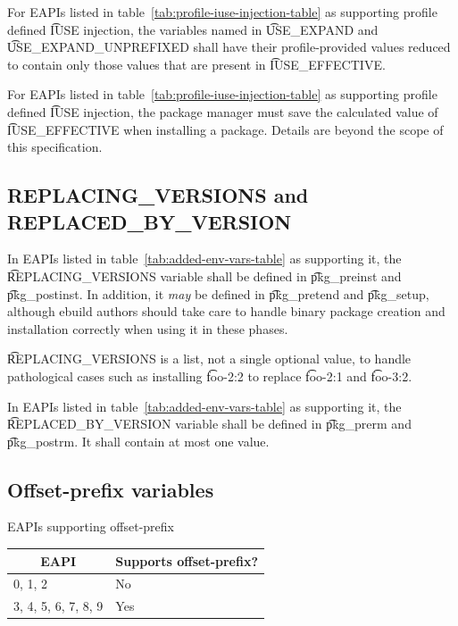 For EAPIs listed in table~\ref{tab:profile-iuse-injection-table} as supporting profile defined
\t{IUSE} injection, the variables named in \t{USE_EXPAND} and \t{USE_EXPAND_UNPREFIXED} shall
have their profile-provided values reduced to contain only those values that are present in
\t{IUSE_EFFECTIVE}.

For EAPIs listed in table~\ref{tab:profile-iuse-injection-table} as supporting profile defined
\t{IUSE} injection, the package manager must save the calculated value of \t{IUSE_EFFECTIVE} when
installing a package. Details are beyond the scope of this specification.

\subsection{REPLACING_VERSIONS and REPLACED_BY_VERSION}
\label{sec:replacing-versions}

 In EAPIs listed in table~\ref{tab:added-env-vars-table} as
supporting it, the \t{REPLACING_VERSIONS} variable shall be defined in \t{pkg_preinst} and
\t{pkg_postinst}. In addition, it \emph{may} be defined in \t{pkg_pretend} and \t{pkg_setup},
although ebuild authors should take care to handle binary package creation and installation
correctly when using it in these phases.

\t{REPLACING_VERSIONS} is a list, not a single optional value, to handle pathological cases such as
installing \t{foo-2:2} to replace \t{foo-2:1} and \t{foo-3:2}.

In EAPIs listed in table~\ref{tab:added-env-vars-table} as supporting it, the
\t{REPLACED_BY_VERSION} variable shall be defined in \t{pkg_prerm} and \t{pkg_postrm}. It shall
contain at most one value.

\subsection{Offset-prefix variables}
\label{sec:offset-vars}

\begin{centertable}{EAPIs supporting offset-prefix}
    \label{tab:offset-support-table}
    \begin{tabular}{ll}
      \toprule
      \multicolumn{1}{c}{\textbf{EAPI}} &
      \multicolumn{1}{c}{\textbf{Supports offset-prefix?}}\\
      \midrule
      0, 1, 2             & No  \\
      3, 4, 5, 6, 7, 8, 9 & Yes \\
      \bottomrule
    \end{tabular}
\end{centertable}

